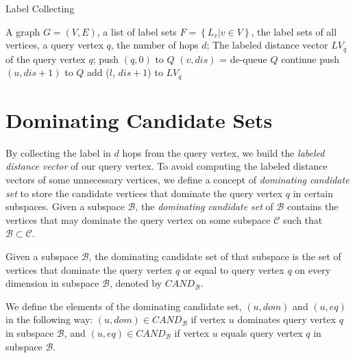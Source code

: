 \begin{algorithm}[h]
  \caption{Label Collecting}
  \label{algo:graph_collect}
  \begin{algorithmic}[1]
  \show\LOOP
    \REQUIRE A graph $G=(V,E)$, a list of label sets $F=\left\{L_v | v \in V\right\}$, the label sets of all vertices, a query vertex $q$, the number of hops $d$;
    \ENSURE The labeled distance vector $LV_q$ of the query vertex $q$;
    \STATE push $\left(q, 0\right)$ to $Q$
        \STATE $\left( v, dis\right)$ = de-queue $Q$
            \STATE continue
        \ENDIF
            \STATE push $\left(u, dis+1\right)$ to $Q$
                    \STATE add ($l$, $dis+1$) to $LV_q$
                \ENDIF
            \ENDFOR
        \ENDFOR
    \ENDWHILE
  \end{algorithmic}
\end{algorithm}

\section{Dominating Candidate Sets}
\label{sec:dom-cand}

By collecting the label in $d$ hops from the query vertex, we build the \emph{labeled distance vector} of our query vertex. To avoid computing the labeled distance vectors of some unnecessary vertices, we define a concept of \emph{dominating candidate set} to store the candidate vertices that dominate the query vertex $q$ in certain subspaces. Given a subspace $\mathcal{B}$, the \emph{dominating candidate set} of $\mathcal{B}$ contains the vertices that may dominate the query vertex on some subspace $\mathcal{C}$ such that $\mathcal{B} \subset \mathcal{C}$.

\begin{definition}
Given a subspace $\mathcal{B}$, the dominating candidate set of that subspace is the set of vertices that dominate the query vertex $q$ or equal to query vertex $q$ on every dimension in subspace $\mathcal{B}$, denoted by $\mathit{CAND}_\mathcal{B}$.

We define the elements of the dominating candidate set, $(u, dom)$ and $(u, eq)$ in the following way: $(u, dom) \in \mathit{CAND}_\mathcal{B}$ if vertex $u$ dominates query vertex $q$ in subspace $\mathcal{B}$, and $(u, eq) \in \mathit{CAND}_\mathcal{B}$ if vertex $u$ equals query vertex $q$ in subspace $\mathcal{B}$.
\end{definition}

